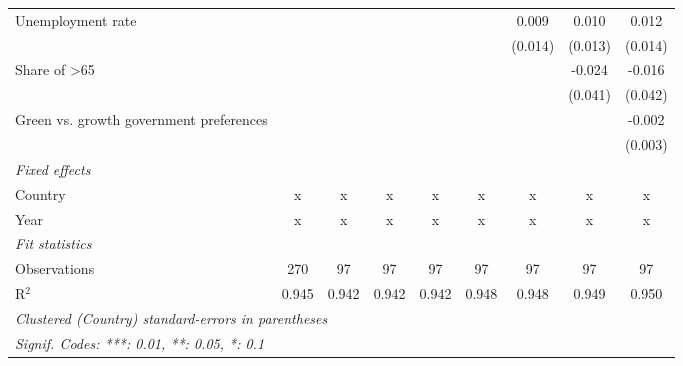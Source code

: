 \begin{table}[htbp]
\begin{tabular}{lcccccccc}
      Unemployment rate                                     &         &              &         &         &         & 0.009   & 0.010   & 0.012\\   
                                                            &         &              &         &         &         & (0.014) & (0.013) & (0.014)\\   
      Share of >65                                          &         &              &         &         &         &         & -0.024  & -0.016\\   
                                                            &         &              &         &         &         &         & (0.041) & (0.042)\\   
      Green vs. growth government preferences               &         &              &         &         &         &         &         & -0.002\\   
                                                            &         &              &         &         &         &         &         & (0.003)\\   
      \emph{Fixed effects}\\
      Country                                               & x       & x            & x       & x       & x       & x       & x       & x\\  
      Year                                                  & x       & x            & x       & x       & x       & x       & x       & x\\  
      \midrule \emph{Fit statistics}\\
      Observations                                          & 270     & 97           & 97      & 97      & 97      & 97      & 97      & 97\\  
      R$^2$                                                 & 0.945   & 0.942        & 0.942   & 0.942   & 0.948   & 0.948   & 0.949   & 0.950\\  
      \midrule
      \multicolumn{9}{l}{\emph{Clustered (Country) standard-errors in parentheses}}\\
      \multicolumn{9}{l}{\emph{Signif. Codes: ***: 0.01, **: 0.05, *: 0.1}}\\
   \end{tabular}
\end{table}


